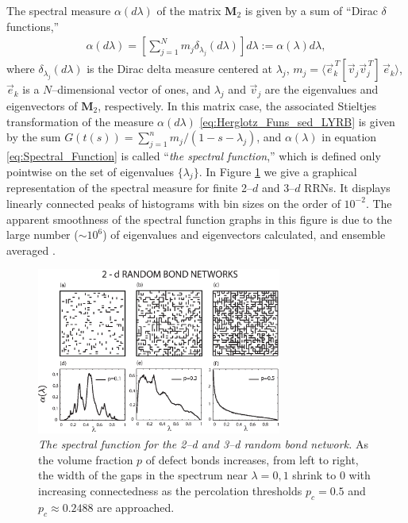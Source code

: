 \documentclass[english,12pt,jmp,graphicx]{revtex4-1}
\begin{document}
The spectral measure $\alpha(d\lambda)$ of the matrix $\mathbf{M}_2$ is given by
a sum of ``Dirac $\delta$ functions,''
%
\begin{align}\label{eq:Spectral_Function}
  \alpha(d\lambda)=
    \left[\sum_{j=1}^N m_j \delta_{\lambda_j}(d\lambda)\right]d\lambda
      :=\alpha(\lambda)d\lambda,
\end{align}
%
where $\delta_{\lambda_j}(d\lambda)$ is the Dirac delta measure centered at $\lambda_j$,
$m_j=\langle\vec{e}_k^{\,T}[\vec{v}_j\vec{v}_j^{\,T}]\,\vec{e}_k\rangle$, 
$\vec{e}_k$ is a $N$--dimensional vector of ones, and $\lambda_j$ and
$\vec{v}_j$ are the eigenvalues and eigenvectors of $\mathbf{M}_2$,
respectively. In this matrix case, the associated Stieltjes
transformation of the measure $\alpha(d\lambda)$ \eqref{eq:Herglotz_Funs_sed_LYRB} is
given by the sum $G(t(s))=\sum_{j=1}^nm_j/(1-s-\lambda_j)$, and $\alpha(\lambda)$ in equation
\eqref{eq:Spectral_Function} is called ``\emph{the spectral
  function},'' which is defined only pointwise on the set of
eigenvalues $\{\lambda_j\}$. In Figure \ref{fig:2D-RRN} we give a graphical
representation of the spectral measure for finite 2--$d$ and 3--$d$
RRNs. It displays linearly connected peaks of histograms with bin
sizes on the order of $10^{-2}$. The apparent smoothness of the
spectral function graphs in this figure is due to the large number
($\sim10^6$) of eigenvalues and eigenvectors calculated, and ensemble
averaged \cite{Golden:JoB:337}. 
%
\begin{figure}\label{fig:2D-RRN}
\includegraphics[width=19pc]{2-d_Random_Resistor_Networks.eps}%
\caption{\emph{The spectral function for the 2--d and 3--d random bond
    network.} As the volume fraction $p$ of defect bonds increases,
  from left to right, the width of the gaps in the spectrum near
  $\lambda=0,1$ shrink to 0 with increasing connectedness as the percolation
  thresholds $p_c=0.5$ and $p_c\approx0.2488$ are approached.}%
\end{figure}
%
\end{document}
